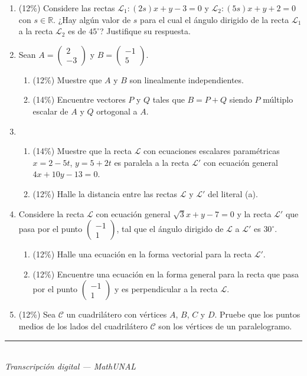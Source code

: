 \documentclass[11pt]{article}
\newcommand{\vect}[2]{\begin{pmatrix}#1\\#2\end{pmatrix}}
\newcommand{\examfooter}{%
  \vfill
  \rule{\linewidth}{0.4pt}\\[1pt]
  {\scriptsize\textit{Transcripción digital --- MathUNAL}\hfill\textcolor{unalblue}{\textbf{\thepage}}}
}
\begin{document}
\begin{enumerate}
\item (12\%) Considere las rectas $\mathcal{L}_1: (2s)x+y-3=0$ y $\mathcal{L}_2: (5s)x+y+2=0$ con $s\in\mathbb{R}$. ¿Hay algún valor de $s$ para el cual el ángulo dirigido de la recta $\mathcal{L}_1$ a la recta $\mathcal{L}_2$ es de $45^\circ$? Justifique su respuesta.

\item Sean $A=\vect{2}{-3}$ y $B=\vect{-1}{5}$.

\begin{enumerate}[label=(\alph*)]
\item (12\%) Muestre que $A$ y $B$ son linealmente independientes.
\item (14\%) Encuentre vectores $P$ y $Q$ tales que $B=P+Q$ siendo $P$ múltiplo escalar de $A$ y $Q$ ortogonal a $A$.
\end{enumerate}

\item \

\begin{enumerate}[label=(\alph*)]
\item (14\%) Muestre que la recta $\mathcal{L}$ con ecuaciones escalares paramétricas $x=2-5t$, $y=5+2t$ es paralela a la recta $\mathcal{L}'$ con ecuación general $4x+10y-13=0$.
\item (12\%) Halle la distancia entre las rectas $\mathcal{L}$ y $\mathcal{L}'$ del literal (a).
\end{enumerate}

\item Considere la recta $\mathcal{L}$ con ecuación general $\sqrt{3}x+y-7=0$ y la recta $\mathcal{L}'$ que pasa por el punto $\vect{-1}{1}$, tal que el ángulo dirigido de $\mathcal{L}$ a $\mathcal{L}'$ es $30^\circ$.

\begin{enumerate}[label=(\alph*)]
\item (12\%) Halle una ecuación en la forma vectorial para la recta $\mathcal{L}'$.
\item (12\%) Encuentre una ecuación en la forma general para la recta que pasa por el punto $\vect{-1}{1}$ y es perpendicular a la recta $\mathcal{L}$.
\end{enumerate}

\item (12\%) Sea $\mathcal{C}$ un cuadrilátero con vértices $A$, $B$, $C$ y $D$. Pruebe que los puntos medios de los lados del cuadrilátero $\mathcal{C}$ son los vértices de un paralelogramo.

\end{enumerate}

\examfooter
\end{document}
